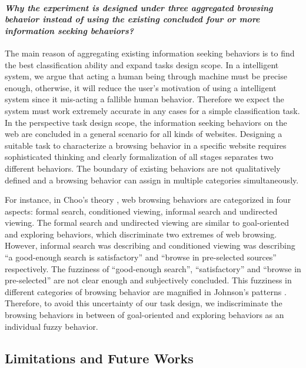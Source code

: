 \paragraph{\emph{Why the experiment is designed under three aggregated browsing behavior instead of
using the existing concluded four or more information seeking behaviors?}}

The main reason of aggregating existing information seeking behaviors is to find the best 
classification ability and expand tasks design scope.
In a intelligent system, we argue that acting a human being through machine must be precise enough,
otherwise, it will reduce the user's motivation of using a intelligent system since
it mis-acting a fallible human behavior. Therefore we expect the system must work
extremely accurate in any cases for a simple classification task.
In the perspective task design scope, the information seeking behaviors on the web 
are concluded in a general scenario for all kinds of websites. Designing a suitable task 
 to characterize a browsing behavior in a specific website requires sophisticated thinking 
and clearly formalization of all stages separates two different behaviors.
The boundary of existing behaviors are not qualitatively defined and a browsing behavior
can assign in multiple categories simultaneously.

For instance, in Choo's theory \cite{choo1999information}, web browsing behaviors 
are categorized in four aspects:
formal search, conditioned viewing, informal search and undirected viewing.
The formal search and undirected viewing are similar to goal-oriented and exploring behaviors,
which discriminate two extremes of web browsing.
However, informal search was describing and conditioned viewing was describing
``a good-enough search is satisfactory'' and ``browse in pre-selected sources'' respectively.
The fuzziness of ``good-enough search'', ``satisfactory'' and ``browse in pre-selected''
are not clear enough and subjectively concluded. This fuzziness in different categories of browsing
behavior are magnified in Johnson's patterns \cite{johnson2017patterns}.
Therefore, to avoid this uncertainty of our task design, we indiscriminate the browsing behaviors
in between of goal-oriented and exploring behaviors as an individual fuzzy behavior.

\subsection{Limitations and Future Works}

